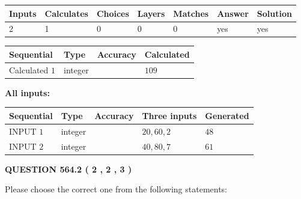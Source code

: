 \documentclass[12pt]{article}
\begin{document}
 
\noindent{}
 
 

 
   
   
   
   
\noindent\begin{tabular}{|l|l|l|l|l|l|l|}
 \hline
Inputs & Calculates & Choices & Layers & Matches & Answer & Solution \\ \hline
 2  & 
 1  & 
 0
  & 
 0  & 
 0  & 
  yes & 
  yes 
  \\ \hline
 \end{tabular}
   
   
   
   
\noindent{}
   
   
  
  
\noindent\begin{tabular}{|l|l|l|l|}
\hline
 Sequential & Type & Accuracy & Calculated \\ 
\hline
 
 
  Calculated $  1 $ & integer &  & 
  $ 109 $ 
 \\  \hline  
 \end{tabular}
   
   
   
   
\noindent\vspace{0.1in}\hspace{-0.08in} {\textbf{\Large{All inputs: }}}
   
   
  
  
\noindent\begin{tabular}{|l|l|l|l|l|}
\hline
 Sequential & Type & Accuracy & Three inputs & Generated \\ 
\hline
 
 
  INPUT $  1 $ & integer &  & $
 20
 , 
 60
 , 
 2
 $ & $ 48 $ 
 \\  \hline  
 
 
  INPUT $  2 $ & integer &  & $
 40
 , 
 80
 , 
 7
 $ & $ 61 $ 
 \\  \hline  
 \end{tabular}
   
   
  
\vspace{0.2in}
  
{\textbf{\Large{QUESTION
564.2 
 ( 2 , 2 , 3 )
}}}
  
  
Please choose the correct one from the following statements:
 
\end{document}
